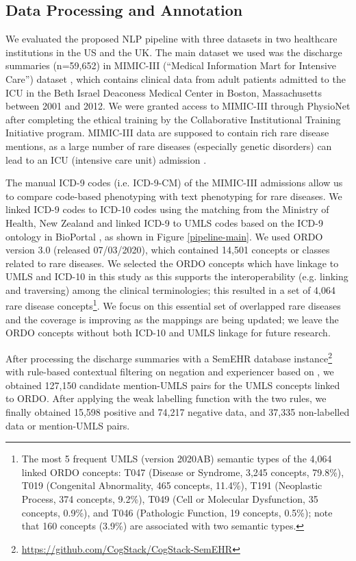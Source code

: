 \documentclass[twocolumn]{bmcart}
\begin{document}
\subsection*{Data Processing and Annotation}
We evaluated the proposed NLP pipeline with three datasets in two healthcare institutions in the US and the UK. The main dataset we used was the discharge summaries (n=59,652) in MIMIC-III (``Medical Information Mart for Intensive Care'') dataset \cite{johnson_mimic-iii_2016}, which contains clinical data from adult patients admitted to the ICU in the Beth Israel Deaconess Medical Center in Boston, Massachusetts between 2001 and 2012. We were granted access to MIMIC-III through PhysioNet after completing the ethical training by the Collaborative Institutional Training Initiative program. MIMIC-III data are supposed to contain rich rare disease mentions, as a large number of rare diseases (especially genetic disorders) can lead to an ICU (intensive care unit) admission \cite{textoris_genetic_2014}.

The manual ICD-9 codes (i.e. ICD-9-CM) of the MIMIC-III admissions allow us to compare code-based phenotyping with text phenotyping for rare diseases. We linked ICD-9 codes to ICD-10 codes using the matching from the Ministry of Health, New Zealand \cite{icd9to10newzeland} and linked ICD-9 to UMLS codes based on the ICD-9 ontology in BioPortal \cite{icd9ontology}, as shown in Figure \ref{pipeline-main}. We used ORDO version 3.0 (released 07/03/2020), which contained 14,501 concepts or classes related to rare diseases. We selected the ORDO concepts which have linkage to UMLS and ICD-10 in this study as this supports the interoperability (e.g. linking and traversing) among the clinical terminologies; this resulted in a set of 4,064 rare disease concepts\footnote{The most 5 frequent UMLS (version 2020AB) semantic types of the 4,064 linked ORDO concepts: T047 (Disease or Syndrome, 3,245 concepts,  79.8\%), T019 (Congenital Abnormality, 465 concepts, 11.4\%), T191 (Neoplastic Process, 374 concepts, 9.2\%), T049 (Cell or Molecular Dysfunction, 35 concepts, 0.9\%), and T046 (Pathologic Function, 19 concepts, 0.5\%); note that 160 concepts (3.9\%) are associated with two semantic types.}. We focus on this essential set of overlapped rare diseases and the coverage is improving as the mappings are being updated; we leave the ORDO concepts without both ICD-10 and UMLS linkage for future research.

After processing the discharge summaries with a SemEHR database instance\footnote{\url{https://github.com/CogStack/CogStack-SemEHR}} \cite{Wu2018semehr} with rule-based contextual filtering on negation and experiencer based on \cite{Harkema2009context}, we obtained 127,150 candidate mention-UMLS pairs for the UMLS concepts linked to ORDO. After applying the weak labelling function with the two rules, we finally obtained 15,598 positive and 74,217 negative data, and 37,335 non-labelled data or mention-UMLS pairs.
\end{document}
